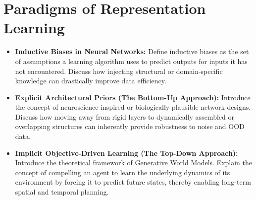 \section{Paradigms of Representation Learning}
\begin{itemize}
    \item \textbf{Inductive Biases in Neural Networks:} Define inductive biases as the set of assumptions a learning algorithm uses to predict outputs for inputs it has not encountered. Discuss how injecting structural or domain-specific knowledge can drastically improve data efficiency.
    \item \textbf{Explicit Architectural Priors (The Bottom-Up Approach):} Introduce the concept of neuroscience-inspired or biologically plausible network designs. Discuss how moving away from rigid layers to dynamically assembled or overlapping structures can inherently provide robustness to noise and OOD data.
    \item \textbf{Implicit Objective-Driven Learning (The Top-Down Approach):} Introduce the theoretical framework of Generative World Models. Explain the concept of compelling an agent to learn the underlying dynamics of its environment by forcing it to predict future states, thereby enabling long-term spatial and temporal planning.
\end{itemize}